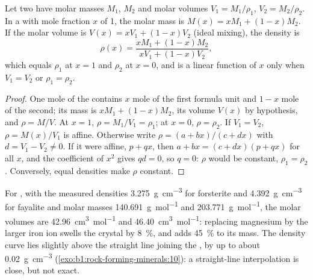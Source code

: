 \begin{proposition}\label{prop:b1:rock-forming-minerals:ideal-mixing}
Let two  have molar masses $M_1$, $M_2$ and molar volumes
$V_1 = M_1/\rho_1$, $V_2 = M_2/\rho_2$. In a  with mole
fraction $x$ of  1, the molar mass is
$M(x) = x M_1 + (1 - x) M_2$. If the molar volume is
$V(x) = x V_1 + (1 - x) V_2$ (ideal mixing), the density is
\[
  \rho(x) = \frac{x M_1 + (1 - x) M_2}{x V_1 + (1 - x) V_2},
\]
which equals $\rho_1$ at $x = 1$ and $\rho_2$ at $x = 0$, and is a linear
function of $x$ only when $V_1 = V_2$ or $\rho_1 = \rho_2$.
\end{proposition}

\begin{proof}
One mole of the  contains $x$ mole of the first formula unit
and $1 - x$ mole of the second; its mass is $x M_1 + (1 - x) M_2$, its volume
$V(x)$ by hypothesis, and $\rho = M/V$. At $x = 1$, $\rho = M_1/V_1 = \rho_1$;
at $x = 0$, $\rho = \rho_2$. If $V_1 = V_2$, $\rho = M(x)/V_1$ is affine.
Otherwise write $\rho = (a + bx)/(c + dx)$ with $d = V_1 - V_2 \ne 0$. If it
were affine, $p + qx$, then $a + bx = (c + dx)(p + qx)$ for all $x$, and the
coefficient of $x^2$ gives $qd = 0$, so $q = 0$: $\rho$ would be constant,
$\rho_1 = \rho_2$. Conversely, equal  densities make $\rho$
constant.
\end{proof}

For , with the measured densities \qty{3.275}{g.cm^{-3}} for
forsterite and \qty{4.392}{g.cm^{-3}} for fayalite and molar masses
\qty{140.691}{g.mol^{-1}} and \qty{203.771}{g.mol^{-1}}, the molar volumes are
\qty{42.96}{cm^3.mol^{-1}} and \qty{46.40}{cm^3.mol^{-1}}: replacing magnesium
by the larger iron ion swells the crystal by \qty{8}{\percent}, and adds
\qty{45}{\percent} to its mass. The density curve lies slightly above the
straight line joining the , by up to about
\qty{0.02}{g.cm^{-3}} (\cref{exo:b1:rock-forming-minerals:10}): a
straight-line interpolation is close, but not exact.


